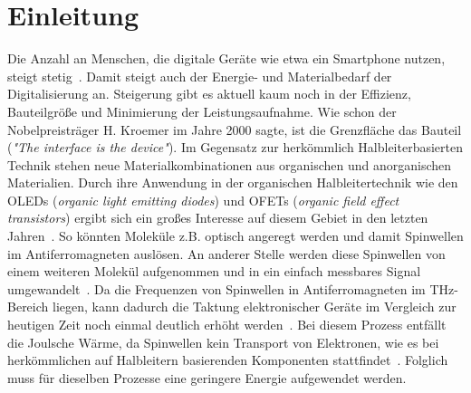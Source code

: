 \chapter{Einleitung}
    Die Anzahl an Menschen, die digitale Geräte wie etwa ein Smartphone nutzen, steigt stetig~\cite{Statista}.
    Damit steigt auch der Energie- und Materialbedarf der Digitalisierung an.
    Steigerung gibt es aktuell kaum noch in der Effizienz, Bauteilgröße und Minimierung der Leistungsaufnahme.
    Wie schon der Nobelpreisträger H. Kroemer im Jahre 2000 sagte, ist die Grenzfläche das Bauteil (\textit{"The interface is the device"}).
    Im Gegensatz zur herkömmlich Halbleiterbasierten Technik stehen neue Materialkombinationen aus organischen und anorganischen Materialien.
    Durch ihre Anwendung in der organischen Halbleitertechnik wie den OLEDs (\textit{organic light emitting diodes}) und OFETs (\textit{organic field effect transistors}) ergibt sich ein großes Interesse auf diesem Gebiet in den letzten Jahren~\cite{Uni-Tübingen}.
    So könnten Moleküle z.B. optisch angeregt werden und damit Spinwellen im Antiferromagneten auslösen. 
    An anderer Stelle werden diese Spinwellen von einem weiteren Molekül aufgenommen und in ein einfach messbares Signal umgewandelt~\cite{SINFONIA}.
    Da die Frequenzen von Spinwellen in Antiferromagneten im \si{\tera\hertz}-Bereich liegen, kann dadurch die Taktung elektronischer Geräte im Vergleich zur heutigen Zeit noch einmal deutlich erhöht werden~\cite{AFM_5}.
    Bei diesem Prozess entfällt die Joulsche Wärme, da Spinwellen kein Transport von Elektronen, wie es bei herkömmlichen auf Halbleitern basierenden Komponenten stattfindet~\cite{AFM_3}.
    Folglich muss für dieselben Prozesse eine geringere Energie aufgewendet werden.
   
